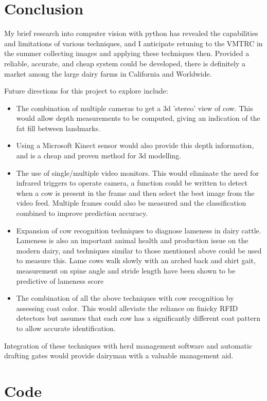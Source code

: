 \documentclass[11pt]{article}
\begin{document}
\newpage
\section{Conclusion}
	My brief research into computer vision with python has revealed the capabilities and limitations of various techniques, and I anticipate retuning to the VMTRC in the summer collecting images and applying these techniques then.
	Provided a reliable, accurate, and cheap system could be developed, there is definitely a market among the large dairy farms in California and Worldwide.

	Future directions for this project to explore include:
	\begin{itemize}
		\item The combination of multiple cameras to get a 3d 'stereo' view of cow. This would allow depth measurements to be computed, giving an indication of the fat fill between landmarks.
		\item Using a Microsoft Kinect sensor would also provide this depth information, and is a cheap and proven method for 3d modelling.
		\item The use of single/multiple video monitors. This would eliminate the need for infrared triggers to operate camera, a function could be written to detect when a cow is present in the frame and then select the best image from the video feed. Multiple frames could also be measured and the classification combined to improve prediction accuracy.
		\item Expansion of cow recognition techniques to diagnose lameness in dairy cattle. Lameness is also an important animal health and production issue on the modern dairy, and techniques similar to those mentioned above could be used to measure this.
			Lame cows walk slowly with an arched back and shirt gait, measurement on spine angle and stride length have been shown to be predictive of lameness score\cite{Viazzi2013,Pluk2012}
		\item The combination of all the above techniques with cow recognition by assessing coat color. This would alleviate the reliance on finicky RFID detectors but assumes that each cow has a significantly different coat pattern to allow accurate identification.
	\end{itemize}

	Integration of these techniques with herd management software and automatic drafting gates would provide dairyman with a valuable management aid.

	\newpage

\section{Code}
	

\newpage


\end{document}
